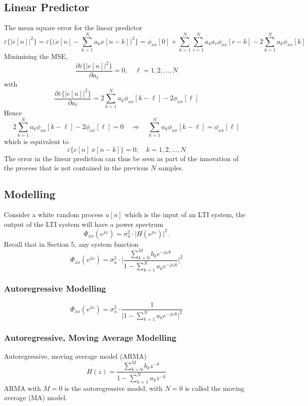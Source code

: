 \subsection{Linear Predictor}
The mean square error for the linear predictor
\[
    \varepsilon\{\lvert e[n] \rvert^2\} = \varepsilon \bigg\{ \bigg( x[n] - \sum_{k=1}^{N} a_k x[n-k] \bigg)^2 \bigg\} = \phi_{xx}[0] + \sum_{k=1}^{N}\sum_{r=1}^N a_k a_r \phi_{xx}[r-k] - 2 \sum_{k=1}^N a_k \phi_{xx}[k]
\]
Minimising the MSE,
\[
    \frac{\partial \varepsilon\{\lvert e[n] \rvert^2\}}{\partial a_{\ell}} = 0, \quad \ell = 1, 2,..., N
\]
with
\[
    \frac{\partial \varepsilon\{\lvert e[n] \rvert^2\}}{\partial a_{\ell}} = 2\sum_{k=1}^N a_k \phi_{xx}[k-\ell] - 2\phi_{xx}[\ell]
\]
Hence
\[
    2\sum_{k=1}^N a_k \phi_{xx}[k-\ell] - 2\phi_{xx}[\ell] = 0 
    \quad \Rightarrow \quad
    \boxed{\sum_{k=1}^N a_k \phi_{xx}[k-\ell] = \phi_{xx}[\ell]}
\]
which is equivalent to
\[
    \varepsilon \{e[n] \ x[n-k] \} = 0, \quad k = 1, 2, ..., N
\]
The error in the linear prediction can thus be seen as part of the innovation of the process that is not contained in the previous $N$ samples.

\subsection{Modelling}
Consider a white random process $u[n]$ which is the input of an LTI system, the output of the LTI system will have a power spectrum
\[
    \Phi_{xx}(e^{j\omega}) = \sigma_u^2 \cdot \lvert H(e^{j\omega}) \rvert^2.
\]
Recall that in Section 5, any system function
\[
    \Phi_{xx}(e^{j\omega}) = \sigma_u^2 \cdot \bigg \lvert \frac{\sum_{k=0}^M b_k e^{-j\omega k}}{1-\sum_{k=1}^N a_k e^{-j\omega k}} \bigg\rvert^2
\]
\subsubsection{Autoregressive Modelling}
\[
    \Phi_{xx}(e^{j\omega}) = \sigma_u^2 \cdot  \frac{1}{\lvert 1-\sum_{k=1}^N a_k e^{-j\omega k}\rvert^2}
\]
\subsubsection{Autoregressive, Moving Average Modelling}
Autoregressive, moving average model (ARMA)
\[
    H(z) = \frac{\sum_{k=0}^M b_k z^{-k}}{1-\sum_{k=1}^N a_k z^{-k}}
\]
ARMA with $M=0$ is the autoregressive model; with $N=0$ is called the moving average (MA) model.

